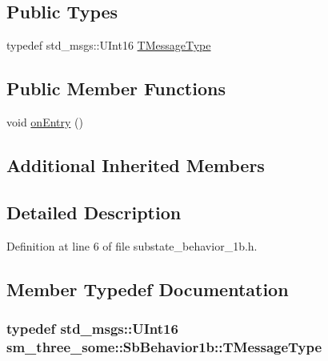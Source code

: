 \subsection*{Public Types}
\begin{DoxyCompactItemize}
\item 
typedef std\+\_\+msgs\+::\+U\+Int16 \hyperlink{classsm__three__some_1_1SbBehavior1b_a52944009042e46154e966826196f9ace}{T\+Message\+Type}
\end{DoxyCompactItemize}
\subsection*{Public Member Functions}
\begin{DoxyCompactItemize}
\item 
void \hyperlink{classsm__three__some_1_1SbBehavior1b_a6fd4288972d526de5a0ff553d76dda0c}{on\+Entry} ()
\end{DoxyCompactItemize}
\subsection*{Additional Inherited Members}


\subsection{Detailed Description}


Definition at line 6 of file substate\+\_\+behavior\+\_\+1b.\+h.



\subsection{Member Typedef Documentation}
\subsubsection[{\texorpdfstring{T\+Message\+Type}{TMessageType}}]{\setlength{\rightskip}{0pt plus 5cm}typedef std\+\_\+msgs\+::\+U\+Int16 {\bf sm\+\_\+three\+\_\+some\+::\+Sb\+Behavior1b\+::\+T\+Message\+Type}}\hypertarget{classsm__three__some_1_1SbBehavior1b_a52944009042e46154e966826196f9ace}{}\label{classsm__three__some_1_1SbBehavior1b_a52944009042e46154e966826196f9ace}


